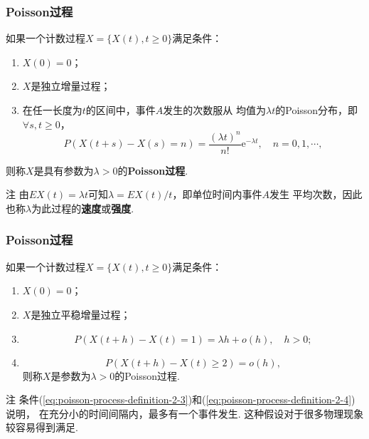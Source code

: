 \begin{frame}
    \frametitle{Poisson过程}
    \begin{mydefinition}[Poisson过程的定义1]
        如果一个计数过程$X=\{X(t),t\geqslant0\}$满足条件：
        \begin{enumerate}
            \item $X(0)=0$；
            \item $X$是独立增量过程；
            \item 在任一长度为$t$的区间中，事件$A$发生的次数服从
            均值为$\lambda t$的Poisson分布，即
            $\forall s,t\geqslant 0$，
            \begin{equation}
                P(X(t+s)-X(s)=n)=\frac{(\lambda t)^n}{n!}\mathrm e^{-\lambda t},\quad n=0,1,\cdots,
            \end{equation}
        \end{enumerate}
        则称$X$是具有参数为$\lambda>0$的\textbf{Poisson过程}.
    \end{mydefinition}
    \begin{block}{注}
        由$EX(t)=\lambda t$可知$\lambda=EX(t)/t$，即单位时间内事件$A$发生
        平均次数，因此也称$\lambda$为此过程的\textbf{速度}或\textbf{强度}.         
    \end{block}
\end{frame}

\begin{frame}
    \frametitle{Poisson过程}
    \begin{mydefinition}[Poisson过程的定义2]
        如果一个计数过程$X=\{X(t),t\geqslant 0\}$满足条件：
        \begin{enumerate}
            \item $X(0)=0$；
            \item $X$是独立平稳增量过程；
            \item \begin{equation}\label{eq:poisson-process-definition-2-3}
                P(X(t+h)-X(t)=1)=\lambda h+o(h),\quad h>0;
            \end{equation}
            \item \begin{equation}\label{eq:poisson-process-definition-2-4}
                P(X(t+h)-X(t)\geqslant 2)=o(h),
            \end{equation}
            则称$X$是参数为$\lambda >0$的Poisson过程. 
        \end{enumerate}
    \end{mydefinition}
    \begin{block}{注}
        条件(\ref{eq:poisson-process-definition-2-3})和(\ref{eq:poisson-process-definition-2-4})说明，
        在充分小的时间间隔内，最多有一个事件发生. 这种假设对于很多物理现象较容易得到满足. 
    \end{block}
\end{frame}

